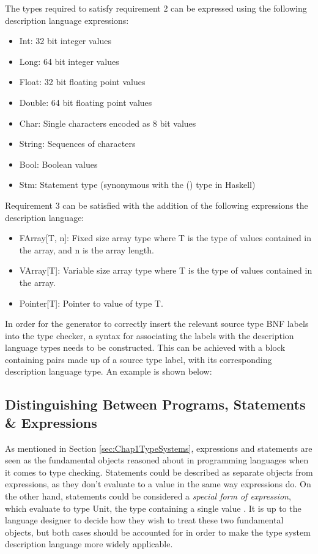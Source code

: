 \documentclass{UoYCSproject}
\begin{document}
The types required to satisfy requirement 2 can be expressed using the following
description language expressions:
\begin{itemize}
    \item {\ttfamily Int}: 32 bit integer values
    \item {\ttfamily Long}: 64 bit integer values
    \item {\ttfamily Float}: 32 bit floating point values
    \item {\ttfamily Double}: 64 bit floating point values
    \item {\ttfamily Char}: Single characters encoded as 8 bit values
    \item {\ttfamily String}: Sequences of characters
    \item {\ttfamily Bool}: Boolean values
    \item {\ttfamily Stm}: Statement type (synonymous with the {\ttfamily ()}
        type in Haskell)
\end{itemize}
Requirement 3 can be satisfied with the addition of the following expressions
the description language:
\begin{itemize}
    \item {\ttfamily FArray[T, n]}: Fixed size array type where {\ttfamily T} is 
        the type of values contained in the array, and {\ttfamily n} is the 
        array length.
    \item {\ttfamily VArray[T]}: Variable size array type where {\ttfamily T} is
        the type of values contained in the array.
    \item {\ttfamily Pointer[T]}: Pointer to value of type T.
\end{itemize}

In order for the generator to correctly insert the relevant source type BNF labels into the type checker, a syntax for associating the labels
with the description language types needs to be constructed. 
This can be achieved with a block containing pairs made up of a source type
label, with its corresponding description language type. An example is shown 
below:


\subsection{Distinguishing Between Programs, Statements \& Expressions}
As mentioned in Section \ref{sec:Chap1TypeSystems}, expressions and statements 
are seen as the fundamental objects reasoned about in programming languages when 
it comes to type checking. Statements could be described as separate objects from 
expressions, as they don't evaluate to a value in the same way expressions do. On
the other hand, statements could be considered a \textit{special form of
    expression}, which evaluate to type {\ttfamily Unit}, the type containing
a single value \cite{PierceTAPL}. It is up to the language designer to decide 
how they wish to
treat these two fundamental objects, but both cases should be accounted for
in order to make the type system description language more widely applicable.
\end{document}
